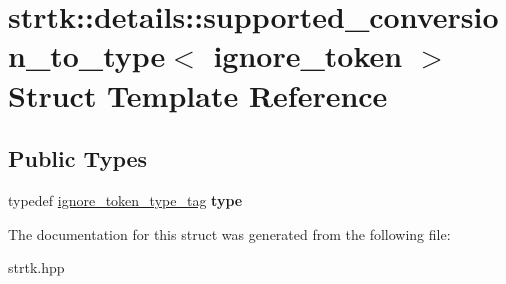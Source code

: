 \hypertarget{structstrtk_1_1details_1_1supported__conversion__to__type_3_01ignore__token_01_4}{\section{strtk\-:\-:details\-:\-:supported\-\_\-conversion\-\_\-to\-\_\-type$<$ ignore\-\_\-token $>$ Struct Template Reference}
\label{structstrtk_1_1details_1_1supported__conversion__to__type_3_01ignore__token_01_4}
}
\subsection*{Public Types}
\begin{DoxyCompactItemize}
\item 
\hypertarget{structstrtk_1_1details_1_1supported__conversion__to__type_3_01ignore__token_01_4_a08c0df3eb479376f7dbf3fe870913b2a}{typedef \hyperlink{structstrtk_1_1details_1_1ignore__token__type__tag}{ignore\-\_\-token\-\_\-type\-\_\-tag} {\bfseries type}}\label{structstrtk_1_1details_1_1supported__conversion__to__type_3_01ignore__token_01_4_a08c0df3eb479376f7dbf3fe870913b2a}

\end{DoxyCompactItemize}


The documentation for this struct was generated from the following file\-:\begin{DoxyCompactItemize}
\item 
strtk.\-hpp\end{DoxyCompactItemize}
